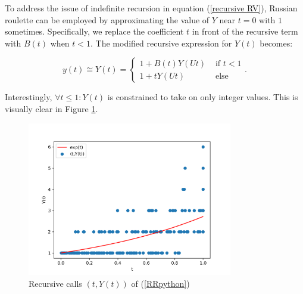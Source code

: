 \documentclass[a4paper,12pt]{article}
\begin{document}
\begin{example} \label{ex: russian roulette}
    To address the issue of indefinite recursion in equation
    (\ref{recursive RV}), Russian roulette can be employed
    by approximating the value of $Y$ near $t = 0$ with $1$
    sometimes. Specifically, we replace the coefficient $t$
    in front of the recursive term with $B(t)$ when $t < 1$.
    The modified recursive expression for $Y(t)$ becomes:

    \begin{equation}\label{eq:rr example}
        y(t) \cong Y(t) =
        \begin{cases}
            1 + B(t)Y(Ut) & \text{ if } t < 1 \\
            1 + tY(Ut)    & \text{ else}
        \end{cases}.
    \end{equation}
\end{example}

\vspace{0.2cm}

\begin{pythonn} \label{RRpython}
    Interestingly, $\forall t \le 1:Y(t)$ is constrained to take on only integer values.
    This is visually clear in Figure \ref{fig:russian roulette}.
    \begin{figure}[h!]
        \centering
        \includegraphics[width=0.8\textwidth]{plots/russian roulette example.png}
        \caption{Recursive calls $(t,Y(t))$ of (\ref{RRpython}) }
        \label{fig:russian roulette}
    \end{figure}

\end{pythonn}
\end{document}
